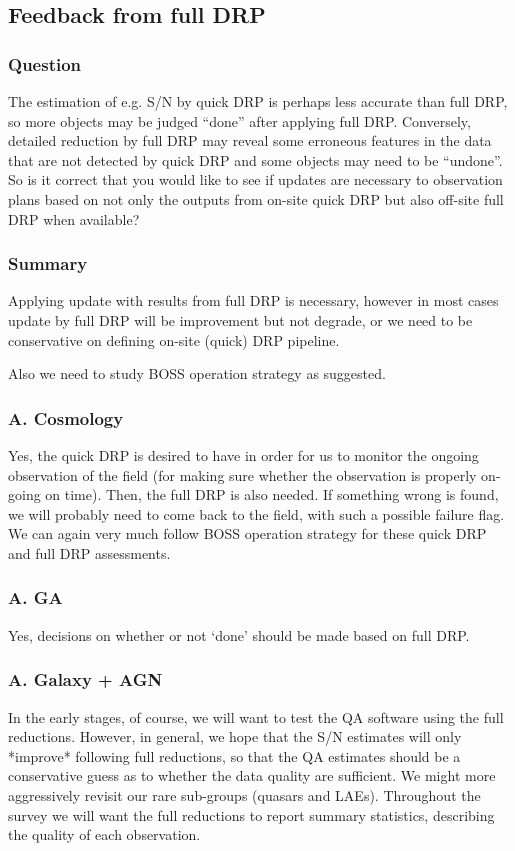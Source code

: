 \documentclass[a4paper,notitlepage]{article}
\begin{document}
\subsection{Feedback from full DRP}

\subsubsection{Question}
The estimation of e.g. S/N by quick DRP is perhaps less
      accurate than full DRP, so more objects may be judged ``done''
      after applying full DRP. Conversely, detailed reduction by
      full DRP may reveal some erroneous features in the data that
      are not detected by quick DRP and some objects may need to be
      ``undone''. So is it correct that you would like to see if
      updates are necessary to observation plans based on not only
      the outputs from on-site quick DRP but also off-site full DRP
      when available?

\subsubsection{Summary}

Applying update with results from full DRP is necessary, however 
in most cases update by full DRP will be improvement but not degrade, 
or we need to be conservative on defining on-site (quick) DRP pipeline. 

Also we need to study BOSS operation strategy as suggested. 

\subsubsection{A. Cosmology}
Yes, the quick DRP is desired to have in order for us to monitor the
ongoing observation of the field (for making sure whether the
observation is properly on-going on time). Then, the full DRP is also
needed. If something wrong is found, we will probably need to come
back to the field, with such a possible failure flag. We can again
very much follow BOSS operation strategy for these quick DRP and full
DRP assessments.


\subsubsection{A. GA}
Yes, decisions on whether or not `done' should be made based on
full DRP.

\subsubsection{A. Galaxy + AGN}
In the early stages, of course, we will want to test the QA software 
using the full reductions.  However, in general, we hope that the 
S/N estimates will only *improve* following full reductions, so that 
the QA estimates should be a conservative guess as to whether 
the data quality are sufficient.  We might more aggressively revisit our 
rare sub-groups (quasars and LAEs).  Throughout the survey we will want 
the full reductions to report summary statistics, describing the quality of 
each observation.
\end{document}
